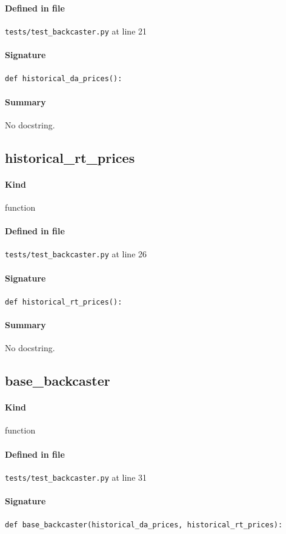 \documentclass[11pt]{report}
\begin{document}
\paragraph{Defined in file} \texttt{tests/test\_backcaster.py} at line 21
\paragraph{Signature} \texttt{def historical\_da\_prices():}
\paragraph{Summary} No docstring.
\subsection{historical\_rt\_prices}
\label{def:tests-test_backcaster.py:historical_rt_prices:L26}
\paragraph{Kind} function
\paragraph{Defined in file} \texttt{tests/test\_backcaster.py} at line 26
\paragraph{Signature} \texttt{def historical\_rt\_prices():}
\paragraph{Summary} No docstring.
\subsection{base\_backcaster}
\label{def:tests-test_backcaster.py:base_backcaster:L31}
\paragraph{Kind} function
\paragraph{Defined in file} \texttt{tests/test\_backcaster.py} at line 31
\paragraph{Signature} \texttt{def base\_backcaster(historical\_da\_prices, historical\_rt\_prices):}
\end{document}
